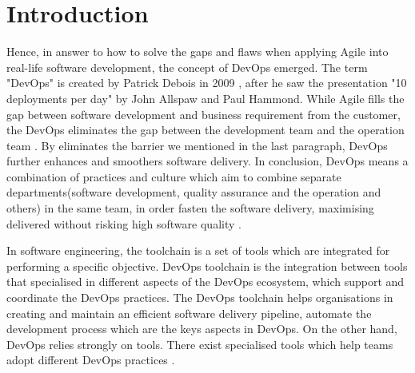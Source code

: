\chapter{Introduction}
\label{chp:introduction}
\par
Hence, in answer to how to solve the gaps and flaws when applying Agile into real-life software development, the concept of DevOps emerged. The term "DevOps" is created by Patrick Debois in 2009 \cite{kim2016devops}, after he saw the presentation "10 deployments per day" by John Allspaw and Paul Hammond. While Agile fills the gap between software development and business requirement from the customer, the DevOps eliminates the gap between the development team and the operation team \cite{WhatisaD20:online}. By eliminates the barrier we mentioned in the last paragraph, DevOps further enhances and smoothers software delivery. In conclusion, DevOps means a combination of practices and culture which aim to combine separate departments(software development, quality assurance and the operation and others) in the same team, in order fasten the software delivery, maximising delivered without risking high software quality \cite{DevOpsWi87:online}\cite{ebert2016devops}.
\par
In software engineering, the toolchain is a set of tools which are integrated for performing a specific objective. DevOps toolchain is the integration between tools that specialised in different aspects of the DevOps ecosystem, which support and coordinate the DevOps practices. The DevOps toolchain helps organisations in creating and maintain an efficient software delivery pipeline, automate the development process \cite{DevOpsto7:online} which are the keys aspects in DevOps. On the other hand, DevOps relies strongly on tools. There exist specialised tools which help teams adopt different DevOps practices \cite{zhu2016devops}. 
